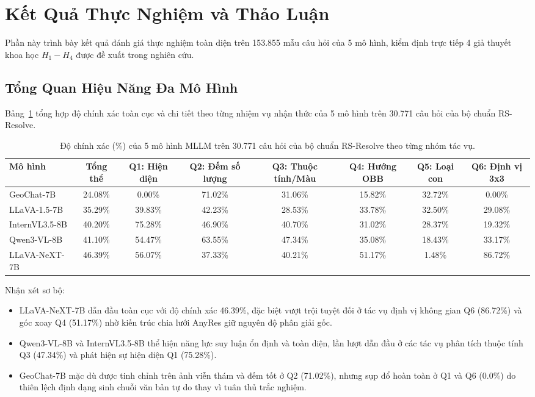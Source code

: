 \section{Kết Quả Thực Nghiệm và Thảo Luận}
\label{sec:results}

Phần này trình bày kết quả đánh giá thực nghiệm toàn diện trên 153.855 mẫu câu hỏi của 5 mô hình, kiểm định trực tiếp 4 giả thuyết khoa học $H_1 - H_4$ được đề xuất trong nghiên cứu.

\subsection{Tổng Quan Hiệu Năng Đa Mô Hình}
Bảng~\ref{tab:overall_acc} tổng hợp độ chính xác toàn cục và chi tiết theo từng nhiệm vụ nhận thức của 5 mô hình trên 30.771 câu hỏi của bộ chuẩn RS-Resolve.

\begin{table}[t]
\centering
\caption{Độ chính xác (\%) của 5 mô hình MLLM trên 30.771 câu hỏi của bộ chuẩn RS-Resolve theo từng nhóm tác vụ.}
\label{tab:overall_acc}
\begin{tabular}{lccccccc}
\toprule
Mô hình & Tổng thể & Q1: Hiện diện & Q2: Đếm số lượng & Q3: Thuộc tính/Màu & Q4: Hướng OBB & Q5: Loại con & Q6: Định vị 3x3 \\
\midrule
GeoChat-7B \cite{geochat2024} & 24.08\% & 0.00\% & 71.02\% & 31.06\% & 15.82\% & 32.72\% & 0.00\% \\
LLaVA-1.5-7B \cite{llava15} & 35.29\% & 39.83\% & 42.23\% & 28.53\% & 33.78\% & 32.50\% & 29.08\% \\
InternVL3.5-8B \cite{internvl2025} & 40.20\% & 75.28\% & 46.90\% & 40.70\% & 31.02\% & 28.37\% & 19.32\% \\
Qwen3-VL-8B \cite{qwen2025vl} & 41.10\% & 54.47\% & 63.55\% & 47.34\% & 35.08\% & 18.43\% & 33.17\% \\
LLaVA-NeXT-7B \cite{llavanext2024} & 46.39\% & 56.07\% & 37.33\% & 40.21\% & 51.17\% & 1.48\% & 86.72\% \\
\bottomrule
\end{tabular}
\end{table}

\noindent Nhận xét sơ bộ:
\begin{itemize}
    \item LLaVA-NeXT-7B dẫn đầu toàn cục với độ chính xác 46.39\%, đặc biệt vượt trội tuyệt đối ở tác vụ định vị không gian Q6 (86.72\%) và góc xoay Q4 (51.17\%) nhờ kiến trúc chia lưới AnyRes giữ nguyên độ phân giải gốc.
    \item Qwen3-VL-8B và InternVL3.5-8B thể hiện năng lực suy luận ổn định và toàn diện, lần lượt dẫn đầu ở các tác vụ phân tích thuộc tính Q3 (47.34\%) và phát hiện sự hiện diện Q1 (75.28\%).
    \item GeoChat-7B mặc dù được tinh chỉnh trên ảnh viễn thám và đếm tốt ở Q2 (71.02\%), nhưng sụp đổ hoàn toàn ở Q1 và Q6 (0.0\%) do thiên lệch định dạng sinh chuỗi văn bản tự do thay vì tuân thủ trắc nghiệm.
\end{itemize}

